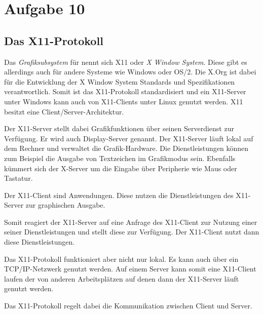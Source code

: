 \chapter{Aufgabe 10}
\section{Das X11-Protokoll}
Das \textit{Grafiksubsystem} für  nennt sich X11 oder \textit{X Window System}.
Diese gibt es allerdings auch für andere Systeme wie Windows oder OS/2.
Die X.Org ist dabei für die Entwicklung der X Window System Standards und Spezifikationen verantwortlich.
Somit ist das X11-Protokoll standardisiert und ein X11-Server unter Windows kann auch von X11-Clients unter Linux genutzt werden.
X11 besitzt eine Client/Server-Architektur.\par
Der X11-Server stellt dabei Grafikfunktionen über seinen Serverdienst zur Verfügung.
Er wird auch Display-Server genannt.
Der X11-Server läuft lokal auf dem Rechner und verwaltet die Grafik-Hardware.
Die Dienstleistungen können zum Beispiel die Ausgabe von Textzeichen im Grafikmodus sein.
Ebenfalls kümmert sich der X-Server um die Eingabe über Peripherie wie Maus oder Tastatur.\par
Der X11-Client sind Anwendungen.
Diese nutzen die Dienstleistungen des X11-Server zur graphischen Ausgabe. \par
Somit reagiert der X11-Server auf eine Anfrage des X11-Client zur Nutzung einer seiner Dienstleistungen und stellt diese zur Verfügung.
Der X11-Client nutzt dann diese Dienstleistungen. \par
Das X11-Protokoll funktioniert aber nicht nur lokal.
Es kann auch über ein TCP/IP-Netzwerk genutzt werden.
Auf einem Server kann somit eine X11-Client laufen der von anderen Arbeitsplätzen auf denen dann der X11-Server läuft genutzt werden.\par
Das X11-Protokoll regelt dabei die Kommunikation zwischen Client und Server\cite{xwindow:2023}\cite{x11:2012}.

